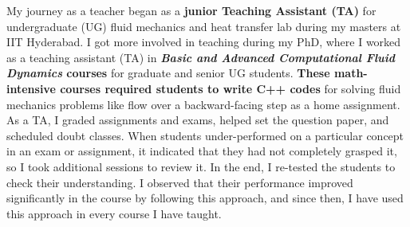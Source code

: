 \documentclass[11pt,a4paper,times]{moderncv} %
\begin{document}
My journey as a teacher began as a \textbf{junior Teaching Assistant (TA)} for undergraduate (UG) fluid mechanics and heat transfer lab during my masters at IIT Hyderabad. I got more involved in teaching during my PhD, where I worked as a teaching assistant (TA) in \textbf{\textit{Basic and Advanced Computational Fluid Dynamics} courses} for graduate and senior UG students. \textbf{These math-intensive courses required students to write C++ codes} for solving fluid mechanics problems like flow over a backward-facing step as a home assignment. As a TA, I graded assignments and exams, helped set the question paper, and scheduled doubt classes. When students under-performed on a particular concept in an exam or assignment, it indicated that they had not completely grasped it, so I took additional sessions to review it. In the end, I re-tested the students to check their understanding. I observed that their performance improved significantly in the course by following this approach, and since then, I have used this approach in every course I have taught.\\ 
\end{document}
